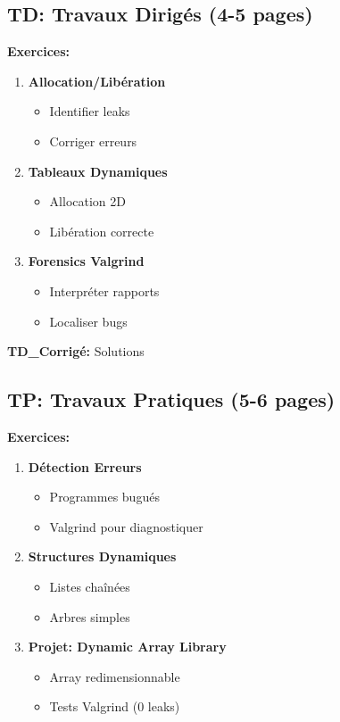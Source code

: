 \documentclass[10pt,a4paper]{article}
\begin{document}
\subsection*{TD: Travaux Dirigés (4-5 pages)}

\textbf{Exercices:}
\begin{enumerate}
\item \textbf{Allocation/Libération}
   \begin{itemize}
   \item Identifier leaks
   \item Corriger erreurs
   \end{itemize}

\item \textbf{Tableaux Dynamiques}
   \begin{itemize}
   \item Allocation 2D
   \item Libération correcte
   \end{itemize}

\item \textbf{Forensics Valgrind}
   \begin{itemize}
   \item Interpréter rapports
   \item Localiser bugs
   \end{itemize}
\end{enumerate}

\textbf{TD\_Corrigé:} Solutions

\subsection*{TP: Travaux Pratiques (5-6 pages)}

\textbf{Exercices:}
\begin{enumerate}
\item \textbf{Détection Erreurs}
   \begin{itemize}
   \item Programmes bugués
   \item Valgrind pour diagnostiquer
   \end{itemize}

\item \textbf{Structures Dynamiques}
   \begin{itemize}
   \item Listes chaînées
   \item Arbres simples
   \end{itemize}

\item \textbf{Projet: Dynamic Array Library}
   \begin{itemize}
   \item Array redimensionnable
   \item Tests Valgrind (0 leaks)
   \end{itemize}
\end{enumerate}
\end{document}
